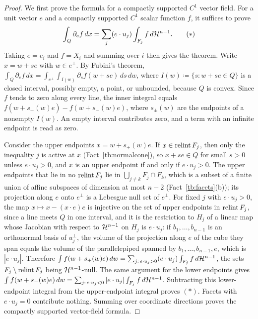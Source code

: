 \begin{proof}
We first prove the formula for a compactly supported \(C^1\) vector
field. For a unit vector \(e\) and a compactly supported
\(C^1\) scalar function \(f\), it suffices to prove
\begin{equation}
 \int_Q\partial_ef\,dx=\sum_j(e\cdot u_j)\int_{F_j}f\,d\mathcal H^{n-1}.
 \tag{\(*\)}
\end{equation}
Taking \(e=e_i\) and \(f=X_i\) and summing over \(i\) then gives the theorem. Write \(x=w+s e\) with \(w\in e^\perp\). By Fubini's theorem,
\(\int_Q\partial_ef\,dx=\int_{e^\perp}\int_{I(w)}\partial_sf(w+s e)\,ds\,dw\),
where \(I(w)\coloneqq \{s:w+s e\in Q\}\) is a closed interval, possibly empty, a point,
or unbounded, because \(Q\) is convex. Since \(f\) tends to zero along every
line, the inner integral equals \(f(w+s_+(w)e)-f(w+s_-(w)e)\), where
\(s_\pm(w)\) are the endpoints of a nonempty \(I(w)\).
An empty interval contributes zero, and a term with an infinite
endpoint is read as zero.

Consider the upper endpoints \(x=w+s_+(w)e\). If \(x\in\operatorname{relint} F_j\), then
only the inequality \(j\) is active at \(x\) (Fact~\ref{tb:normalcone}), so
\(x+s e\in Q\) for small \(s>0\) unless \(e\cdot u_j>0\), and \(x\) is an upper
endpoint if and only if \(e\cdot u_j>0\). The upper endpoints that lie in no
\(\operatorname{relint} F_j\) lie in \(\bigcup_{j\ne k}F_j\cap F_k\), which is a subset of a
finite union of affine subspaces of dimension at most \(n-2\)
(Fact~\ref{tb:facets}(b)); its projection along \(e\) onto \(e^\perp\) is a
Lebesgue null set of \(e^\perp\). For fixed \(j\) with \(e\cdot u_j>0\), the
map \(x\mapsto x-(x\cdot e)e\) is injective on the set of upper endpoints in
\(\operatorname{relint} F_j\), since a line meets \(Q\) in one interval, and it is the
restriction to \(H_j\) of a linear map whose Jacobian with respect to
\(\mathcal H^{n-1}\) on \(H_j\) is \(e\cdot u_j\): if \(b_1,\ldots,b_{n-1}\) is an
orthonormal basis of \(u_j^\perp\), the volume of the projection along \(e\)
of the cube they span equals the volume of the parallelepiped spanned by
\(b_1,\ldots,b_{n-1},e\), which is \(|e\cdot u_j|\). Therefore
\(\int f(w+s_+(w)e)\,dw=\sum_{j:\,e\cdot u_j>0}(e\cdot u_j)\int_{F_j}f\,d\mathcal H^{n-1}\),
the sets \(F_j\setminus\operatorname{relint} F_j\) being \(\mathcal H^{n-1}\)-null. The same
argument for the lower endpoints gives
\(\int f(w+s_-(w)e)\,dw
=\sum_{j:\,e\cdot u_j<0}|e\cdot u_j|\int_{F_j}f\,d\mathcal H^{n-1}\).
Subtracting this lower-endpoint integral from the upper-endpoint
integral proves \((*)\). Facets with \(e\cdot u_j=0\) contribute
nothing. Summing over coordinate directions proves the compactly
supported vector-field formula.


\end{proof}
